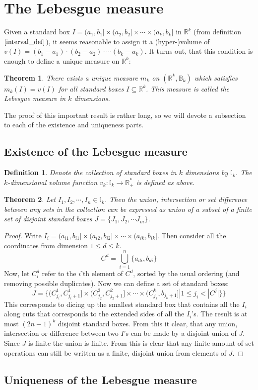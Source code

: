 \documentclass[12pt, a4paper]{article}
\newtheorem{theorem}{Theorem}[section]
\newtheorem{definition}{Definition}[section]
\numberwithin{equation}{section}
\begin{document}
\section{The Lebesgue measure}
Given a standard box $I=(a_1,b_1]\times(a_2,b_2]\times\cdots\times(a_k,b_k]$ in $\mathbb{R}^k$ (from definition $\ref{interval_def}$), it seems reasonable to assign it a (hyper-)volume of $v(I)=(b_1-a_1)\cdot(b_2-a_2)\cdot\cdots(b_k-a_k)$. It turns out, that this condition is enough to define a unique measure on $\mathbb{R}^k$:

\begin{theorem}
There exists a unique measure $m_k$ on $(\mathbb{R}^k,\mathbb{B}_k)$ which satisfies $m_k(I)=v(I)$ for all standard boxes $I\subseteq\mathbb{R}^k$. This measure is called the Lebesgue measure in $k$ dimensions.
\end{theorem}

The proof of this important result is rather long, so we will devote a subsection to each of the existence and uniqueness parts.

\subsection{Existence of the Lebesgue measure}
\begin{definition}
Denote the collection of standard boxes in $k$ dimensions by $\mathbb{I}_k$. The $k$-dimensional volume function $v_k: \mathbb{I}_k\rightarrow\mathbb{R}^*_+$ is defined as above.
\end{definition}

\begin{theorem}
Let $I_1, I_2,\cdots, I_n\in\mathbb{I}_k$. Then the union, intersection or set difference between any sets in the collection can be expressed as union of a subset of a finite set of disjoint standard boxes $J=\{J_1,J_2,\cdots J_m\}$.
\end{theorem}
\begin{proof}
Write $I_i=(a_{i1},b_{i1}]\times(a_{i2},b_{i2}]\times\cdots\times(a_{ik},b_{ik}]$. Then consider all the coordinates from dimension $1\le d\le k$.
\begin{equation}
C^d=\bigcup_{i=1}^n\{a_{di},b_{di}\}
\end{equation}
Now, let $C^d_i$ refer to the $i$'th element of $C^d$, sorted by the usual ordering (and removing possible duplicates). Now we can define a set of standard boxes:
\begin{equation}
J=\{(C^1_{j_i},C^1_{j_i+1}]\times(C^2_{j_2},C^2_{j_2+1}]\times\cdots\times(C^k_{j_k},b_{j_k+1}]|1\le j_i<|C^j|\}\}
\end{equation}
This corresponds to dicing up the smallest standard box that contains all the $I_i$ along cuts that corresponds to the extended sides of all the $I_i$'s. The result is at most $(2n-1)^k$ disjoint standard boxes. From this it clear, that any union, intersection or difference between two $I$'s can be made by a disjoint union of $J$. Since $J$ is finite the union is finite. From this is clear that any finite amount of set operations can still be written as a finite, disjoint union from elements of $J$.
\end{proof}

\subsection{Uniqueness of the Lebesgue measure}
\end{document}
